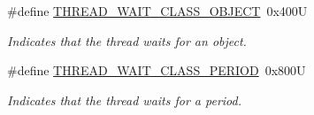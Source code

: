 \begin{DoxyCompactItemize}
\mbox{\label{group__RTEMSScoreThread_ga8ad326b1eb2ad7ab1c74a69052aac37c}} 
\#define \mbox{\hyperlink{group__RTEMSScoreThread_ga8ad326b1eb2ad7ab1c74a69052aac37c}{T\+H\+R\+E\+A\+D\+\_\+\+W\+A\+I\+T\+\_\+\+C\+L\+A\+S\+S\+\_\+\+O\+B\+J\+E\+CT}}~0x400U
\begin{DoxyCompactList}\small\item\em Indicates that the thread waits for an object. \end{DoxyCompactList}\item 
\mbox{\label{group__RTEMSScoreThread_ga3c32beedd8bfee369f065b40a33a8af7}} 
\#define \mbox{\hyperlink{group__RTEMSScoreThread_ga3c32beedd8bfee369f065b40a33a8af7}{T\+H\+R\+E\+A\+D\+\_\+\+W\+A\+I\+T\+\_\+\+C\+L\+A\+S\+S\+\_\+\+P\+E\+R\+I\+OD}}~0x800U
\begin{DoxyCompactList}\small\item\em Indicates that the thread waits for a period. \end{DoxyCompactList}\end{DoxyCompactItemize}
